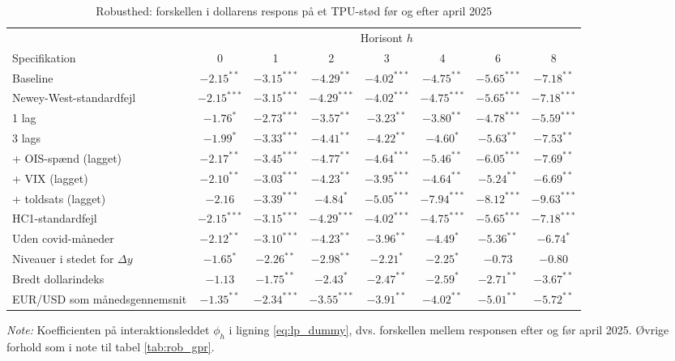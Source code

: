 \begin{table}[H]
\centering
\caption{Robusthed: forskellen i dollarens respons på et TPU-stød før og efter april 2025}
\label{tab:rob_tpu_brud}
\begin{threeparttable}
\begin{tabular}{lccccccc}
\toprule
 & \multicolumn{7}{c}{Horisont $h$} \\
\cmidrule(lr){2-8}
Specifikation & 0 & 1 & 2 & 3 & 4 & 6 & 8 \\
\midrule
Baseline & $-2.15^{**}$ & $-3.15^{***}$ & $-4.29^{**}$ & $-4.02^{***}$ & $-4.75^{**}$ & $-5.65^{***}$ & $-7.18^{**}$ \\
Newey-West-standardfejl & $-2.15^{***}$ & $-3.15^{***}$ & $-4.29^{***}$ & $-4.02^{***}$ & $-4.75^{***}$ & $-5.65^{***}$ & $-7.18^{***}$ \\
1 lag & $-1.76^{*}$ & $-2.73^{***}$ & $-3.57^{**}$ & $-3.23^{**}$ & $-3.80^{**}$ & $-4.78^{***}$ & $-5.59^{***}$ \\
3 lags & $-1.99^{*}$ & $-3.33^{***}$ & $-4.41^{**}$ & $-4.22^{**}$ & $-4.60^{*}$ & $-5.63^{**}$ & $-7.53^{**}$ \\
+ OIS-spænd (lagget) & $-2.17^{**}$ & $-3.45^{***}$ & $-4.77^{**}$ & $-4.64^{***}$ & $-5.46^{**}$ & $-6.05^{***}$ & $-7.69^{**}$ \\
+ VIX (lagget) & $-2.10^{**}$ & $-3.03^{***}$ & $-4.23^{**}$ & $-3.95^{***}$ & $-4.64^{**}$ & $-5.24^{**}$ & $-6.69^{**}$ \\
+ toldsats (lagget) & $-2.16$ & $-3.39^{***}$ & $-4.84^{*}$ & $-5.05^{***}$ & $-7.94^{***}$ & $-8.12^{***}$ & $-9.63^{***}$ \\
HC1-standardfejl & $-2.15^{***}$ & $-3.15^{***}$ & $-4.29^{***}$ & $-4.02^{***}$ & $-4.75^{***}$ & $-5.65^{***}$ & $-7.18^{***}$ \\
Uden covid-måneder & $-2.12^{**}$ & $-3.10^{***}$ & $-4.23^{**}$ & $-3.96^{**}$ & $-4.49^{*}$ & $-5.36^{**}$ & $-6.74^{*}$ \\
Niveauer i stedet for $\Delta y$ & $-1.65^{*}$ & $-2.26^{**}$ & $-2.98^{**}$ & $-2.21^{*}$ & $-2.25^{*}$ & $-0.73$ & $-0.80$ \\
Bredt dollarindeks & $-1.13$ & $-1.75^{**}$ & $-2.43^{*}$ & $-2.47^{**}$ & $-2.59^{*}$ & $-2.71^{**}$ & $-3.67^{**}$ \\
EUR/USD som månedsgennemsnit & $-1.35^{**}$ & $-2.34^{***}$ & $-3.55^{***}$ & $-3.91^{**}$ & $-4.02^{**}$ & $-5.01^{**}$ & $-5.72^{**}$ \\
\bottomrule
\end{tabular}
\begin{tablenotes}[flushleft]\footnotesize
\item \textit{Note:} Koefficienten på interaktionsleddet $\phi_h$ i ligning \eqref{eq:lp_dummy}, dvs. forskellen mellem responsen efter og før april 2025. Øvrige forhold som i note til tabel \ref{tab:rob_gpr}.
\end{tablenotes}
\end{threeparttable}
\end{table}